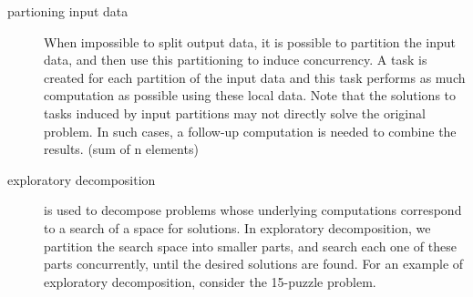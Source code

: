 \begin{description}
\item[partioning input data] When impossible to split output data, it is possible to partition the input data, and then use this partitioning to induce concurrency. A task is created for each partition of the input data and this task performs as much computation as possible using these local data. Note that the solutions to tasks induced by input partitions may not directly solve the original problem. In such cases, a follow-up computation is needed to combine the results. (sum of n elements)

\item[exploratory decomposition] is used to decompose problems whose underlying computations correspond to a search of a space for solutions. In exploratory decomposition, we partition the search space into smaller parts, and search each one of these parts concurrently, until the desired solutions are found. For an example of exploratory decomposition, consider the 15-puzzle problem.







\end{description}
